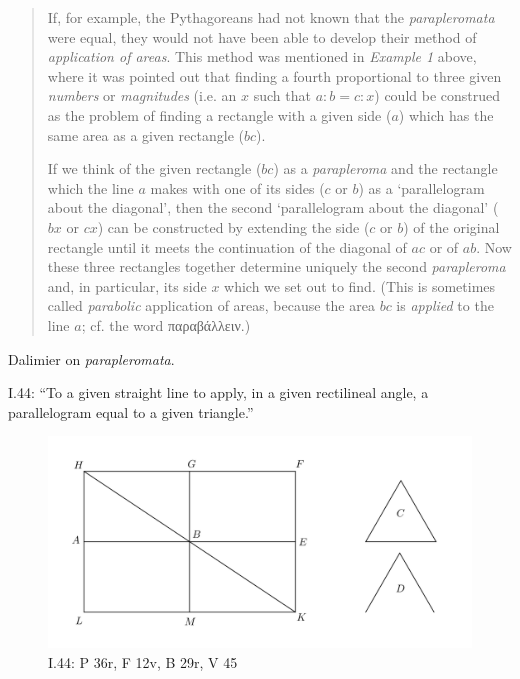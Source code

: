 \documentclass{article}
\begin{document}
\begin{quote}
If, for example, the Pythagoreans had
not known that the {\em parapleromata} were  equal, they would not have
been able to develop their method of {\em application of areas}. This method
was mentioned in {\em Example 1} above, where it was pointed out that
finding a fourth proportional to three given {\em numbers} or {\em magnitudes} (i.e.
an $x$ such that $a:b=c:x$) could be construed as the problem of
finding a rectangle with a given side ($a$) which has the same area as a
given rectangle ($bc$). 

If we think of the given rectangle
($bc$) as a {\em parapleroma} and the rectangle which the line $a$ makes with
one of its sides ($c$ or $b$) as a `parallelogram about the diagonal', then the
second `parallelogram about the diagonal' ($bx$ or $cx$) can be constructed 
by extending the side ($c$ or $b$) of the original rectangle until it meets the 
continuation of the diagonal of $ac$ or of $ab$. Now these 
three rectangles together determine uniquely the second {\em parapleroma}
and, in particular, its side $x$ which we set out to find. (This is sometimes
called {\em parabolic} application of areas, because the area $bc$ is {\em applied}
to the line $a$; cf. the word παραβάλλειν.)
\end{quote}

Dalimier \cite{dalimier} on {\em parapleromata}.


I.44: ``To a given straight line to apply, in a given rectilineal
angle, a parallelogram equal to a given triangle.''

\begin{figure}
\begin{center}
\includegraphics{I44.png}
\end{center}
\caption{I.44:  P 36r, F 12v, B 29r, V 45}
\label{I44}
\end{figure}
\end{document}
